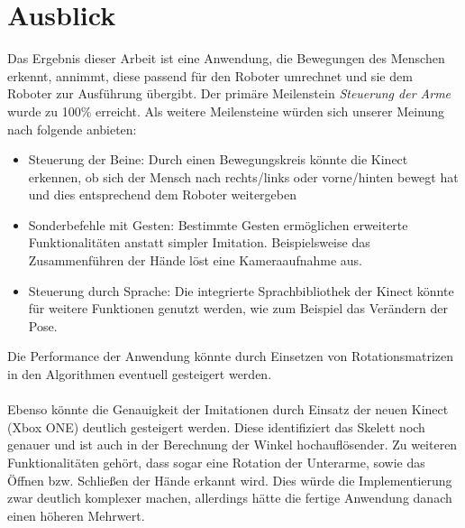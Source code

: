 \section{Ausblick}      %
Das Ergebnis dieser Arbeit ist eine Anwendung, die Bewegungen des Menschen erkennt, annimmt, diese passend für den Roboter umrechnet und sie dem Roboter zur Ausführung übergibt. Der primäre Meilenstein \textit{Steuerung der Arme} wurde zu 100\% erreicht. Als weitere Meilensteine würden sich unserer Meinung nach folgende anbieten: 
\begin{itemize}
\item Steuerung der Beine: Durch einen Bewegungskreis könnte die Kinect erkennen, ob sich der Mensch  nach rechts/links oder vorne/hinten bewegt hat und dies entsprechend dem Roboter weitergeben
\item Sonderbefehle mit Gesten: Bestimmte Gesten ermöglichen erweiterte Funktionalitäten anstatt simpler Imitation. Beispielsweise das Zusammenführen der Hände löst eine Kameraaufnahme aus. 
\item Steuerung durch Sprache: Die integrierte Sprachbibliothek der Kinect könnte für weitere Funktionen genutzt werden, wie zum Beispiel das Verändern der Pose.
\end{itemize}
Die Performance der Anwendung könnte durch Einsetzen von Rotationsmatrizen in den Algorithmen eventuell gesteigert werden.
\\
\\
\noindent
Ebenso könnte die Genauigkeit der Imitationen durch Einsatz der neuen Kinect (Xbox ONE) deutlich gesteigert werden. Diese identifiziert das Skelett noch genauer und ist auch in der Berechnung der Winkel hochauflösender. Zu weiteren Funktionalitäten gehört, dass sogar eine Rotation der Unterarme, sowie das Öffnen bzw. Schließen der Hände erkannt wird. Dies würde die Implementierung zwar deutlich komplexer machen, allerdings hätte die fertige Anwendung danach einen höheren Mehrwert.

%


	